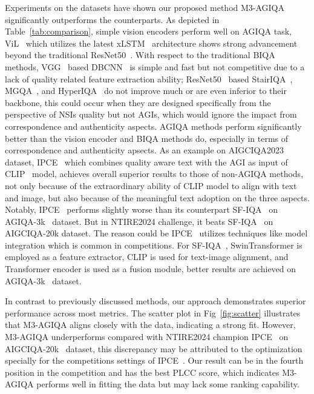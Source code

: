 Experiments on the datasets have shown our proposed method M3-AGIQA significantly outperforms the counterparts. As depicted in Table~\ref{tab:comparison},
simple vision encoders perform well on AGIQA task, ViL~\cite{alkin2024visionlstm} which utilizes the latest xLSTM~\cite{beck2024xlstm} architecture shows strong advancement beyond the traditional ResNet50~\cite{he2016deep}. 
With respect to the traditional BIQA methods, VGG~\cite{simonyan2014very} based DBCNN~\cite{zhang2018blind} is simple and fast but not competitive due to a lack of quality related feature extraction ability;
ResNet50~\cite{he2016deep} based StairIQA~\cite{sun2022blind}, MGQA~\cite{wang2021multi}, and HyperIQA~\cite{Su_2020_CVPR} do not improve much or are even inferior to their backbone, this could occur when they are designed specifically from the perspective of NSIs quality but not AGIs, which would ignore the impact from correspondence and authenticity aspects.
AGIQA methods perform significantly better than the vision encoder and BIQA methods do, especially in terms of correspondence and authenticity apsects.
As an example on AIGCIQA2023~\cite{wang2023aigciqa2023} dataset, IPCE~\cite{peng2024aigc} which combines quality aware text with the AGI as input of CLIP~\cite{radford2021learning} model, achieves overall superior results to those of non-AGIQA methods, not only because of the extraordinary ability of CLIP model to align with text and image, but also because of the meaningful text adoption on the three aspects.
Notably, IPCE~\cite{peng2024aigc} performs slightly worse than its counterpart SF-IQA~\cite{yu2024sf} on AGIQA-3k~\cite{li2023agiqa} dataset.
But in NTIRE2024 challenge, it beats SF-IQA~\cite{yu2024sf} on AIGCIQA-20k dataset.
The reason could be IPCE~\cite{peng2024aigc} utilizes techniques like model integration which is common in competitions.
For SF-IQA~\cite{yu2024sf}, SwinTransformer is employed as a feature extractor, CLIP is used for text-image alignment, and Transformer encoder is used as a fusion module, better results are achieved on AGIQA-3k~\cite{li2023agiqa} dataset.

In contrast to previously discussed methods, our approach demonstrates superior performance across most metrics.
The scatter plot in Fig~\ref{fig:scatter} illustrates that M3-AGIQA aligns closely with the data, indicating a strong fit.
However, M3-AGIQA underperforms compared with NTIRE2024 champion IPCE~\cite{peng2024aigc} on AIGCIQA-20k~\cite{li2024aigiqa} dataset, this discrepancy may be attributed to the optimization specially for the competitions settings of IPCE~\cite{peng2024aigc}.
Our result can be in the fourth position in the competition and has the best PLCC score, which indicates M3-AGIQA performs well in fitting the data but may lack some ranking capability.
